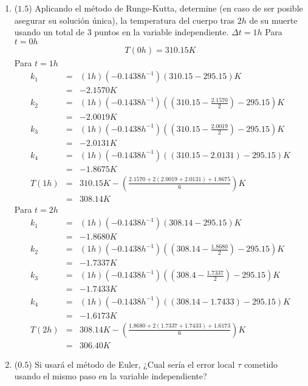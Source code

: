 \documentclass[12pt]{article}
\begin{document}
\begin{enumerate}[leftmargin=*,widest=9]
\begin{enumerate}[label=\alph*]
    \item (\(1.5\)) Aplicando el método de Runge-Kutta, determine (en caso de ser posible asegurar su solución única), la temperatura del cuerpo tras \(2h\) de su muerte usando un total de 3 puntos en la variable independiente.
    $\Delta t = 1h$
    Para $ t =  0h$
    \begin{eqnarray*}
    T(0h) =  310.15K
	\end{eqnarray*}
    Para $ t = 1 h$
    \begin{eqnarray*}
    k_1 &=& (1h)(-0.1438 h^{-1})(310.15-295.15)K \\ &=& -2.1570K \\ k_2 &=& (1h)(-0.1438 h^{-1})\left(\left(310.15- \frac{2.1570}{2} \right) - 295.15 \right) K \\ &=& -2.0019K \\  k_3 &=& (1h)(-0.1438 h^{-1})\left(\left(310.15- \frac{2.0019}{2} \right) - 295.15 \right) K \\ &=& -2.0131K \\  k_4 &=& (1h)(-0.1438 h^{-1})((310.15- 2.0131)-295.15)K \\ &=& -1.8675K \\ T(1h) &=& 310.15 K - \left( \frac{2.1570 + 2(2.0019+2.0131)+1.8675}{6}\right)K \\ &=& 308.14K
    \end{eqnarray*}
    Para $t = 2h$
    \begin{eqnarray*}
    k_1 &=& (1h)(-0.1438 h^{-1})(308.14-295.15)K \\ &=& -1.8680K \\ k_2 &=& (1h)(-0.1438 h^{-1})\left(\left(308.14- \frac{1.8680}{2} \right) - 295.15 \right) K \\ &=& -1.7337K \\  k_3 &=& (1h)(-0.1438 h^{-1})\left(\left(308.4- \frac{1.7337}{2} \right) - 295.15 \right) K \\ &=& -1.7433K \\  k_4 &=& (1h)(-0.1438 h^{-1})((308.14- 1.7433)-295.15)K \\ &=& -1.6173K \\ T(2h) &=& 308.14 K - \left( \frac{1.8680 + 2(1.7337+1.7433)+1.6173}{6}\right)K \\ &=& 306.40K
    \end{eqnarray*}
    \item (\(0.5\)) Si usará el método de Euler, ¿Cual sería el error local \(\tau\) cometido usando el mismo paso en la variable independiente?
   \begin{eqnarray*}

\end{eqnarray*}
\end{enumerate}
\end{enumerate}
\end{document}
